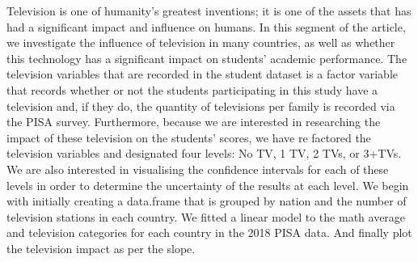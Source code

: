 Television is one of humanity's greatest inventions; it is one of the
assets that has had a significant impact and influence on humans. In
this segment of the article, we investigate the influence of television
in many countries, as well as whether this technology has a significant
impact on students' academic performance. The television variables that
are recorded in the student dataset is a factor variable that records
whether or not the students participating in this study have a
television and, if they do, the quantity of televisions per family is
recorded via the PISA survey. Furthermore, because we are interested in
researching the impact of these television on the students' scores, we
have re factored the television variables and designated four levels: No
TV, 1 TV, 2 TVs, or 3+TVs. We are also interested in visualising the
confidence intervals for each of these levels in order to determine the
uncertainty of the results at each level. We begin with initially
creating a data.frame that is grouped by nation and the number of
television stations in each country. We fitted a linear model to the
math average and television categories for each country in the 2018 PISA
data. And finally plot the television impact as per the slope.

